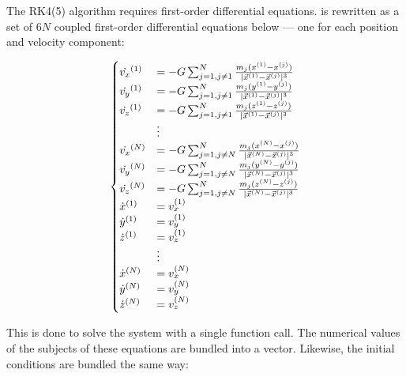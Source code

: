 \documentclass{physics_article_B}
\begin{document}
The RK4(5) algorithm requires first-order differential equations.  is rewritten as a set of $6N$ coupled first-order differential equations below --- one for each position and velocity component:

\begin{equation}
 \left\{
 \begin{array}{@{}ll@{}}
 \dot{v_x}^{(1)} &= -G\sum_{j = 1,j\neq 1}^N\frac{m_j(x^{(1)} - x^{(j)})}{|\vec{x}^{(1)} - \vec{x}^{(j)}|^3}\\
 \dot{v_y}^{(1)} &= -G\sum_{j = 1,j\neq 1}^N\frac{m_j(y^{(1)} - y^{(j)})}{|\vec{x}^{(1)} - \vec{x}^{(j)}|^3}\\
 \dot{v_z}^{(1)} &= -G\sum_{j = 1,j\neq 1}^N\frac{m_j(z^{(1)} - z^{(j)})}{|\vec{x}^{(1)} - \vec{x}^{(j)}|^3}\\
 &\vdots\\
 \dot{v_x}^{(N)} &= -G\sum_{j = 1,j\neq N}^N\frac{m_j(x^{(N)} - x^{(j)})}{|\vec{x}^{(N)} - \vec{x}^{(j)}|^3}\\
 \dot{v_y}^{(N)} &= -G\sum_{j = 1,j\neq N}^N\frac{m_j(y^{(N)} - y^{(j)})}{|\vec{x}^{(N)} - \vec{x}^{(j)}|^3}\\
 \dot{v_z}^{(N)} &= -G\sum_{j = 1,j\neq N}^N\frac{m_j(z^{(N)} - z^{(j)})}{|\vec{x}^{(N)} - \vec{x}^{(j)}|^3}\\
 \dot{x}^{(1)} &= v_x^{(1)}\\
 \dot{y}^{(1)} &= v_y^{(1)}\\
 \dot{z}^{(1)} &= v_z^{(1)}\\
 &\vdots\\
 \dot{x}^{(N)} &= v_x^{(N)}\\
 \dot{y}^{(N)} &= v_y^{(N)}\\
 \dot{z}^{(N)} &= v_z^{(N)}\\
 \end{array}\right.
 \label{eq:coupledeqns}
\end{equation}

This is done to solve the system with a single function call. The numerical values of the subjects of these equations are bundled into a vector. Likewise, the initial conditions are bundled the same way:
\end{document}
